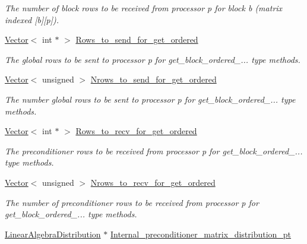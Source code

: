 \begin{DoxyCompactItemize}
\begin{DoxyCompactList}\small\item\em The number of block rows to be received from processor p for block b (matrix indexed \mbox{[}b\mbox{]}\mbox{[}p\mbox{]}). \end{DoxyCompactList}\item 
\hyperlink{classoomph_1_1Vector}{Vector}$<$ int $\ast$ $>$ \hyperlink{classoomph_1_1BlockPreconditioner_a47d5bfe73b47ab79504e878d372dd65f}{Rows\+\_\+to\+\_\+send\+\_\+for\+\_\+get\+\_\+ordered}
\begin{DoxyCompactList}\small\item\em The global rows to be sent to processor p for get\+\_\+block\+\_\+ordered\+\_\+... type methods. \end{DoxyCompactList}\item 
\hyperlink{classoomph_1_1Vector}{Vector}$<$ unsigned $>$ \hyperlink{classoomph_1_1BlockPreconditioner_ae1a0fcd29c4939f668d2225b5d33caf5}{Nrows\+\_\+to\+\_\+send\+\_\+for\+\_\+get\+\_\+ordered}
\begin{DoxyCompactList}\small\item\em The number global rows to be sent to processor p for get\+\_\+block\+\_\+ordered\+\_\+... type methods. \end{DoxyCompactList}\item 
\hyperlink{classoomph_1_1Vector}{Vector}$<$ int $\ast$ $>$ \hyperlink{classoomph_1_1BlockPreconditioner_a68830fbf53861f7b2e3e6a1b4843f6b2}{Rows\+\_\+to\+\_\+recv\+\_\+for\+\_\+get\+\_\+ordered}
\begin{DoxyCompactList}\small\item\em The preconditioner rows to be received from processor p for get\+\_\+block\+\_\+ordered\+\_\+... type methods. \end{DoxyCompactList}\item 
\hyperlink{classoomph_1_1Vector}{Vector}$<$ unsigned $>$ \hyperlink{classoomph_1_1BlockPreconditioner_a0265c19418608d4a525c159abe1b5c60}{Nrows\+\_\+to\+\_\+recv\+\_\+for\+\_\+get\+\_\+ordered}
\begin{DoxyCompactList}\small\item\em The number of preconditioner rows to be received from processor p for get\+\_\+block\+\_\+ordered\+\_\+... type methods. \end{DoxyCompactList}\item 
\hyperlink{classoomph_1_1LinearAlgebraDistribution}{Linear\+Algebra\+Distribution} $\ast$ \hyperlink{classoomph_1_1BlockPreconditioner_a58079eb938b4d3602d0819cf68b318c0}{Internal\+\_\+preconditioner\+\_\+matrix\+\_\+distribution\+\_\+pt}

\end{DoxyCompactItemize}
